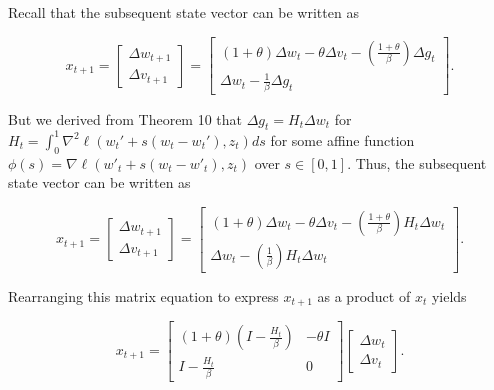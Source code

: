 \documentclass[twoside,11pt]{article}
\begin{document}
\noindent
Recall that the subsequent state vector can be written as

\begin{equation}
x_{t+1} = \begin{bmatrix}
    \Delta w_{t+1} \\
    \Delta v_{t+1}
\end{bmatrix} = \begin{bmatrix}
    (1+\theta)\Delta w_t - \theta \Delta v_t - (\frac{1+\theta}{\beta})\Delta g_t \\
    \Delta w_t - \frac{1}{\beta} \Delta g_t
\end{bmatrix}.
\end{equation}

\noindent
But we derived from Theorem 10 that $\Delta g_t = H_t\Delta w_t$ for $H_t = \int_{0}^{1} \nabla^2 \ell (w_t' + s(w_t - w_t'), z_t)ds$ for some affine function $\phi(s) = \nabla \ell (w'_t + s(w_t - w'_t), z_t)$ over $s \in [0,1]$. Thus, the subsequent state vector can be written as

\begin{equation}
x_{t+1} = \begin{bmatrix}
    \Delta w_{t+1} \\
    \Delta v_{t+1}
\end{bmatrix} = \begin{bmatrix}
    (1+\theta)\Delta w_t - \theta \Delta v_t - (\frac{1+\theta}{\beta})H_t\Delta w_t \\
    \Delta w_t - (\frac{1}{\beta})H_t\Delta w_t
\end{bmatrix}.
\end{equation}

\noindent
Rearranging this matrix equation to express $x_{t+1}$ as a product of $x_t$ yields

\begin{equation}
x_{t+1} = \begin{bmatrix}
    (1+\theta)(I-\frac{H_t}{\beta}) & -\theta I \\
    I - \frac{H_t}{\beta} & 0
\end{bmatrix}\begin{bmatrix}
    \Delta w_t \\
    \Delta v_t
\end{bmatrix}.
\end{equation}
\end{document}
